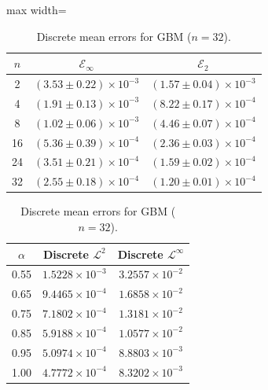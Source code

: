 \documentclass[11pt, a4paper]{article}
\theoremstyle{theoremstyle}
\theoremstyle{definitionstyle}
\begin{document}
\begin{table}[htbp]
    \centering
    \begin{minipage}[t]{0.48\textwidth}
        \centering
        \caption{Trajectory errors $\pm$ resampled Monte Carlo standard error for GBM ($\alpha = 1.0$).}
        \label{tab:gbm_traj}
        \begin{adjustbox}{max width=\textwidth}
        \begin{tabular}{ccc}
            \toprule
            $n$ & $\mathcal E_\infty$ & $\mathcal E_2$ \\
            \midrule
            2  & $(3.53 \pm 0.22) \times 10^{-3}$ & $(1.57 \pm 0.04) \times 10^{-3}$ \\
            4  & $(1.91 \pm 0.13) \times 10^{-3}$ & $(8.22 \pm 0.17) \times 10^{-4}$ \\
            8  & $(1.02 \pm 0.06) \times 10^{-3}$ & $(4.46 \pm 0.07) \times 10^{-4}$ \\
            16 & $(5.36 \pm 0.39) \times 10^{-4}$ & $(2.36 \pm 0.03) \times 10^{-4}$ \\
            24 & $(3.51 \pm 0.21) \times 10^{-4}$ & $(1.59 \pm 0.02) \times 10^{-4}$ \\
            32 & $(2.55 \pm 0.18) \times 10^{-4}$ & $(1.20 \pm 0.01) \times 10^{-4}$ \\
            \bottomrule
        \end{tabular}
        \end{adjustbox}
    \end{minipage}
    \hfill
    \begin{minipage}[t]{0.48\textwidth}
        \centering
        \caption{Discrete mean errors for GBM ($n = 32$).}
        \label{tab:gbm_mean}
        \begin{tabular}{ccc}
            \toprule
            $\alpha$ & Discrete $\mathcal L^2$ & Discrete $\mathcal L^\infty$ \\
            \midrule
            0.55 & $1.5228 \times 10^{-3}$ & $3.2557 \times 10^{-2}$ \\
            0.65 & $9.4465 \times 10^{-4}$ & $1.6858 \times 10^{-2}$ \\
            0.75 & $7.1802 \times 10^{-4}$ & $1.3181 \times 10^{-2}$ \\
            0.85 & $5.9188 \times 10^{-4}$ & $1.0577 \times 10^{-2}$ \\
            0.95 & $5.0974 \times 10^{-4}$ & $8.8803 \times 10^{-3}$ \\
            1.00 & $4.7772 \times 10^{-4}$ & $8.3202 \times 10^{-3}$ \\
            \bottomrule
        \end{tabular}
    \end{minipage}
\end{table}
\end{document}
